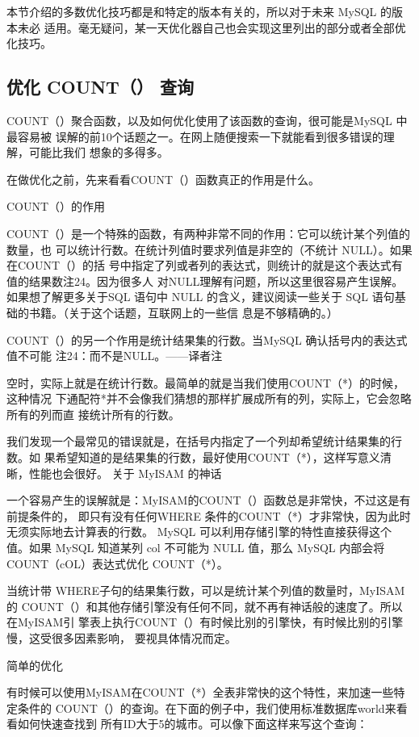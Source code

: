 本节介绍的多数优化技巧都是和特定的版本有关的，所以对于未来 MySQL 的版本未必
适用。毫无疑问，某一天优化器自己也会实现这里列出的部分或者全部优化技巧。

\subsection{优化 COUNT（） 查询}
COUNT（）聚合函数，以及如何优化使用了该函数的查询，很可能是MySQL 中最容易被
误解的前10个话题之一。在网上随便搜索一下就能看到很多错误的理解，可能比我们
想象的多得多。

在做优化之前，先来看看COUNT（）函数真正的作用是什么。

COUNT（）的作用

COUNT（）是一个特殊的函数，有两种非常不同的作用：它可以统计某个列值的数量，也
可以统计行数。在统计列值时要求列值是非空的（不统计 NULL）。如果在COUNT（）的括
号中指定了列或者列的表达式，则统计的就是这个表达式有值的结果数注24。因为很多人
对NULL理解有问题，所以这里很容易产生误解。如果想了解更多关于SQL 语句中 NULL
的含义，建议阅读一些关于 SQL 语句基础的书籍。（关于这个话题，互联网上的一些信
息是不够精确的。）

COUNT（）的另一个作用是统计结果集的行数。当MySQL 确认括号内的表达式值不可能
注24：而不是NULL。——译者注

空时，实际上就是在统计行数。最简单的就是当我们使用COUNT（*）的时候，这种情况
下通配符*并不会像我们猜想的那样扩展成所有的列，实际上，它会忽略所有的列而直
接统计所有的行数。

我们发现一个最常见的错误就是，在括号内指定了一个列却希望统计结果集的行数。如
果希望知道的是结果集的行数，最好使用COUNT（*），这样写意义清晰，性能也会很好。
关于 MyISAM 的神话

一个容易产生的误解就是：MyISAM的COUNT（）函数总是非常快，不过这是有前提条件的，
即只有没有任何WHERE 条件的COUNT（*）才非常快，因为此时无须实际地去计算表的行数。
MySQL 可以利用存储引擎的特性直接获得这个值。如果 MySQL 知道某列 col 不可能为
NULL 值，那么 MySQL 内部会将 COUNT（cOL）表达式优化 COUNT（*）。

当统计带 WHERE子句的结果集行数，可以是统计某个列值的数量时，MyISAM的
COUNT（）和其他存储引擎没有任何不同，就不再有神话般的速度了。所以在MyISAM引
擎表上执行COUNT（）有时候比别的引擎快，有时候比别的引擎慢，这受很多因素影响，
要视具体情况而定。

简单的优化

有时候可以使用MyISAM在COUNT（*）全表非常快的这个特性，来加速一些特定条件的
COUNT（）的查询。在下面的例子中，我们使用标准数据库world来看看如何快速查找到
所有ID大于5的城市。可以像下面这样来写这个查询：

